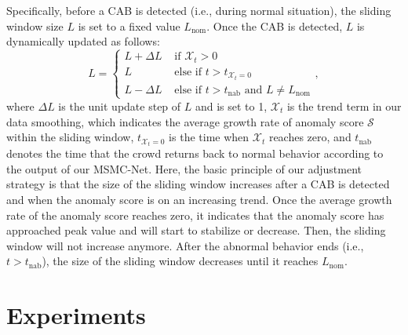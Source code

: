 \documentclass[journal]{IEEEtran}
\begin{document}
Specifically, before a CAB is detected (i.e., during normal situation), the sliding window size $L$ is set to a fixed value $L_\mathrm{nom}$. Once the CAB is detected, $L$ is dynamically updated as follows: 
\begin{equation}
L =\begin{cases}
 L + \Delta L & \text{ if }  \mathcal{X}_{t}>0  \\
 L & \text{ else if } t>t_{ \mathcal{X}_{t}=0}      \\
 L - \Delta L & \text{ else if } t>t_{\mathrm{nab}} \text{ and } L \neq L_\mathrm{nom}
\end{cases} ,
\end{equation}
where $\Delta L$ is the unit update step of $L$ and is set to 1, $\mathcal{X}_{t}$ is the trend term in our data smoothing, which indicates the average growth rate of anomaly score $\mathcal{S}$ within the sliding window, $t_{\mathcal{X}_{t}=0}$ is the time when $\mathcal{X}_{t}$ reaches zero, and $t_{\mathrm{nab}}$ denotes the time that the crowd returns back to normal behavior according to the output of our MSMC-Net. Here, the basic principle of our adjustment strategy is that the size of the sliding window increases after a CAB is detected and when the anomaly score is on an increasing trend. Once the average growth rate of the anomaly score reaches zero, it indicates that the anomaly score has approached peak value and will start to stabilize or decrease. Then, the sliding window will not increase anymore. After the abnormal behavior ends (i.e., $t>t_{\mathrm{nab}}$), the size of the sliding window decreases until it reaches $L_\mathrm{nom}$.

\section{Experiments}
\end{document}
